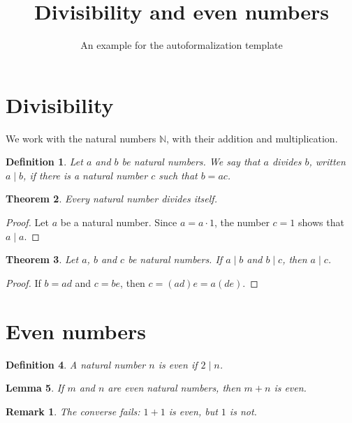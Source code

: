 \documentclass{article}
\title{Divisibility and even numbers}
\author{An example for the autoformalization template}
\date{}
\newtheorem{definition}{Definition}[section]
\newtheorem{theorem}[definition]{Theorem}
\newtheorem{lemma}[definition]{Lemma}
\newtheorem*{remark}{Remark}
\newcommand{\N}{\mathbb{N}}
\begin{document}
\maketitle

\section{Divisibility}

We work with the natural numbers $\N$, with their addition and multiplication.

\begin{definition}\label{def:divides}
Let $a$ and $b$ be natural numbers. We say that $a$ \emph{divides} $b$,
written $a \mid b$, if there is a natural number $c$ such that $b = ac$.
\end{definition}

\begin{theorem}\label{thm:refl}
Every natural number divides itself.
\end{theorem}

\begin{proof}
Let $a$ be a natural number. Since $a = a \cdot 1$, the number $c = 1$
shows that $a \mid a$.
\end{proof}

\begin{theorem}\label{thm:trans}
Let $a$, $b$ and $c$ be natural numbers. If $a \mid b$ and $b \mid c$,
then $a \mid c$.
\end{theorem}

\begin{proof}
If $b = ad$ and $c = be$, then $c = (ad)e = a(de)$.
\end{proof}

\section{Even numbers}

\begin{definition}\label{def:even}
A natural number $n$ is \emph{even} if $2 \mid n$.
\end{definition}

\begin{lemma}\label{lem:sum}
If $m$ and $n$ are even natural numbers, then $m + n$ is even.
\end{lemma}

\begin{remark}
The converse fails: $1 + 1$ is even, but $1$ is not.
\end{remark}
\end{document}

